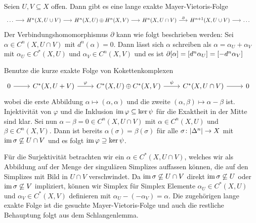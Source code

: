 \begin{satz}[{name=[{relative Mayer-Vietoris-Folge in Kohomologie}]},label=satz:MV_relativ_koho]
	Seien $U,V \subseteq X$ offen. Dann gibt es eine lange exakte Mayer-Vietoris-Folge 
	\[
		\begin{tikzcd}[sep=1.55em]
			\ldots \rar & H^n(X,U \cup V) \rar & H^n(X,U) \oplus H^n(X,V) \rar & H^n(X,U\cap V) \rar["\partial"] & H^{n+1}(X,U\cup V) \rar & \ldots 
		\end{tikzcd}
	\]
	Der Verbindungshomomorphismus $\partial$ kann wie folgt beschrieben werden: Sei $\alpha \in C^n(X,U \cap V)$ mit $d^n(\alpha)=0$.
	Dann lässt sich $\alpha$ schreiben als $\alpha= \alpha_U + \alpha_V$ mit $\alpha_U \in C^*(X,U)$ und $\alpha_V \in C^n(X,V)$ und es ist $\partial [\alpha] = \benbrace*{d^n \alpha_U}= \benbrace*{-d^n \alpha_V}$
\end{satz}
\begin{beweis}
	Benutze die kurze exakte Folge von Kokettenkomplexen 
	\[
		\begin{tikzcd}
			0 \rar & C^*(X,U + V) \rar["\varphi"] & C^*(X,U) \oplus C^*(X,V) \rar["\psi"] & C^*(X, U \cap V) \rar & 0
		\end{tikzcd}
	\]
	wobei die erste Abbildung $\alpha \mapsto (\alpha,\alpha)$ und die zweite $(\alpha,\beta) \mapsto \alpha-\beta$ ist.
	Injektivität von $\varphi$ und die Inklusion $\im \varphi \subseteq \ker \psi$ für die Exaktheit in der Mitte sind klar.
	Sei nun $\alpha- \beta=0 \in C^n(X,U \cap V)$ mit $\alpha \in C^n(X,U)$ und $\beta \in C^n(X,V)$.
	Dann ist bereits $\alpha(\sigma)=\beta(\sigma)$ für alle $\sigma \colon \abs*{\Delta^n} \to X$ mit $\im \sigma \not\subseteq U \cap V$ und es folgt $\im \varphi \supseteq \ker \psi$.
	
	Für die Surjektivität betrachten wir ein $\alpha \in C^*(X, U \cap V)$, welches wir als Abbildung auf der Menge der singulären Simplizes auffassen können, die auf den Simplizes mit Bild in $U \cap V$ verschwindet.
	Da $\im \sigma \not\subseteq U \cap V$ direkt $\im \sigma \not\subseteq U$ oder $\im \sigma \not\subseteq V$ impliziert, können wir Simplex für Simplex Elemente $\alpha_U \in C^*(X,U)$ und $\alpha_V \in C^*(X,V)$ definieren mit $\alpha_U - (- \alpha_V)=\alpha$. 
	Die zugehörigen lange exakte Folge ist die gesuchte Mayer-Vietoris-Folge und auch die restliche Behauptung folgt aus dem Schlangenlemma.
\end{beweis}

